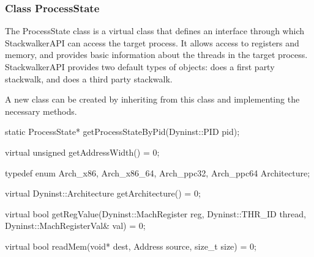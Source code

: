 \subsubsection{Class ProcessState}
\label{subsec:processstate}

The ProcessState class is a virtual class that defines an interface through
which StackwalkerAPI can access the target process. It allows access to
registers and memory, and provides basic information about the threads in the
target process. StackwalkerAPI provides two default types of 
objects:  does a first party stackwalk, and  does a third party
stackwalk.

A new  class can be created by inheriting from this class and
implementing the necessary methods.

\begin{apient}
static ProcessState* getProcessStateByPid(Dyninst::PID pid);
\end{apient}


\begin{apient}
virtual unsigned getAddressWidth() = 0;
\end{apient}

\begin{apient}
 typedef enum { Arch_x86, Arch_x86_64, Arch_ppc32, Arch_ppc64 } Architecture;

 virtual Dyninst::Architecture getArchitecture() = 0;
\end{apient}

\begin{apient}
virtual bool getRegValue(Dyninst::MachRegister reg,
                         Dyninst::THR_ID thread,
                         Dyninst::MachRegisterVal& val) = 0;
\end{apient}

\begin{apient}
virtual bool readMem(void* dest, Address source, size_t size) = 0;
\end{apient}

